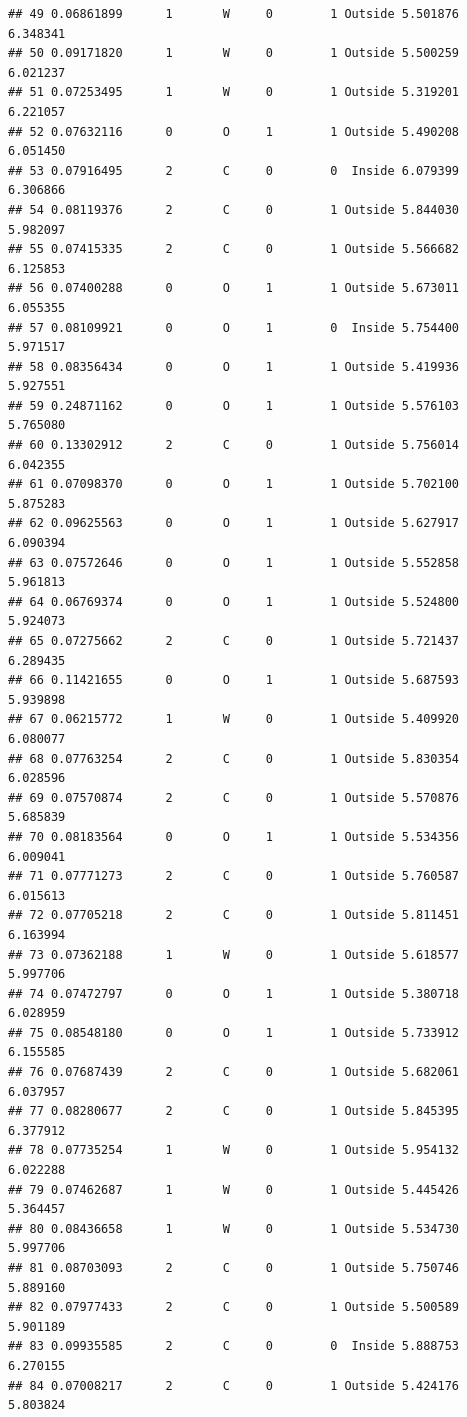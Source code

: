\documentclass[]{article}
\begin{document}
\begin{verbatim}
## 49 0.06861899      1       W     0        1 Outside 5.501876 6.348341
## 50 0.09171820      1       W     0        1 Outside 5.500259 6.021237
## 51 0.07253495      1       W     0        1 Outside 5.319201 6.221057
## 52 0.07632116      0       O     1        1 Outside 5.490208 6.051450
## 53 0.07916495      2       C     0        0  Inside 6.079399 6.306866
## 54 0.08119376      2       C     0        1 Outside 5.844030 5.982097
## 55 0.07415335      2       C     0        1 Outside 5.566682 6.125853
## 56 0.07400288      0       O     1        1 Outside 5.673011 6.055355
## 57 0.08109921      0       O     1        0  Inside 5.754400 5.971517
## 58 0.08356434      0       O     1        1 Outside 5.419936 5.927551
## 59 0.24871162      0       O     1        1 Outside 5.576103 5.765080
## 60 0.13302912      2       C     0        1 Outside 5.756014 6.042355
## 61 0.07098370      0       O     1        1 Outside 5.702100 5.875283
## 62 0.09625563      0       O     1        1 Outside 5.627917 6.090394
## 63 0.07572646      0       O     1        1 Outside 5.552858 5.961813
## 64 0.06769374      0       O     1        1 Outside 5.524800 5.924073
## 65 0.07275662      2       C     0        1 Outside 5.721437 6.289435
## 66 0.11421655      0       O     1        1 Outside 5.687593 5.939898
## 67 0.06215772      1       W     0        1 Outside 5.409920 6.080077
## 68 0.07763254      2       C     0        1 Outside 5.830354 6.028596
## 69 0.07570874      2       C     0        1 Outside 5.570876 5.685839
## 70 0.08183564      0       O     1        1 Outside 5.534356 6.009041
## 71 0.07771273      2       C     0        1 Outside 5.760587 6.015613
## 72 0.07705218      2       C     0        1 Outside 5.811451 6.163994
## 73 0.07362188      1       W     0        1 Outside 5.618577 5.997706
## 74 0.07472797      0       O     1        1 Outside 5.380718 6.028959
## 75 0.08548180      0       O     1        1 Outside 5.733912 6.155585
## 76 0.07687439      2       C     0        1 Outside 5.682061 6.037957
## 77 0.08280677      2       C     0        1 Outside 5.845395 6.377912
## 78 0.07735254      1       W     0        1 Outside 5.954132 6.022288
## 79 0.07462687      1       W     0        1 Outside 5.445426 5.364457
## 80 0.08436658      1       W     0        1 Outside 5.534730 5.997706
## 81 0.08703093      2       C     0        1 Outside 5.750746 5.889160
## 82 0.07977433      2       C     0        1 Outside 5.500589 5.901189
## 83 0.09935585      2       C     0        0  Inside 5.888753 6.270155
## 84 0.07008217      2       C     0        1 Outside 5.424176 5.803824

\end{verbatim}
\end{document}
